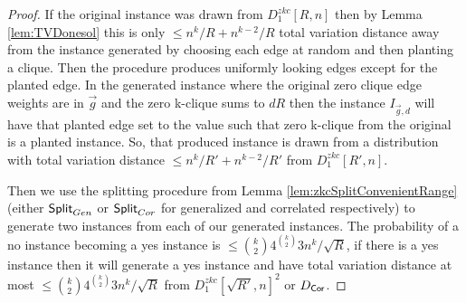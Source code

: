 \begin{proof}
	If the original instance was drawn from $D^{zkc}_{1}[R,n]$ then by Lemma \ref{lem:TVDonesol} this is only $\leq n^k/R + n^{k-2}/R$ total variation distance away from the instance generated by choosing each edge at random and then planting a clique. Then the procedure produces uniformly looking edges except for the planted edge. In the generated instance where the original zero clique edge weights are in $\vec{g}$ and the zero k-clique sums to $dR$ then the instance $I_{\vec{g},d}$ will have that planted edge set to the value such that zero k-clique from the original is a planted instance. So, that produced instance is drawn from a distribution with total variation distance $\leq n^k/R' + n^{k-2}/{R'}$ from $D^{zkc}_{1}[R',n]$. 
	
	Then we use the splitting procedure from Lemma \ref{lem:zkcSplitConvenientRange} (either $\mathsf{Split}_{Gen}$ or $\mathsf{Split}_{Cor}$ for generalized and correlated respectively) to generate two instances from each of our generated instances. The probability of a no instance becoming a yes instance is $\leq \binom{k}{2}4^{\binom{k}{2}}3 n^k/\sqrt{R}$, if there is a yes instance then it will generate a yes instance and have total variation distance at most $\leq \binom{k}{2}4^{\binom{k}{2}}3 n^k/\sqrt{R}$ from $D^{zkc}_{1}[\sqrt{R'},n]^2$ or $D_{\mathsf{Cor}}$.
\end{proof}

